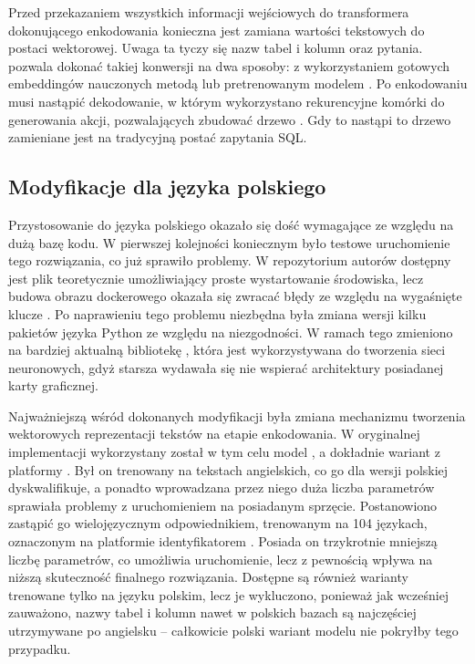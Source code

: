 Przed przekazaniem wszystkich informacji wejściowych do transformera dokonującego enkodowania konieczna jest zamiana wartości tekstowych do postaci wektorowej. Uwaga ta tyczy się nazw tabel i kolumn oraz pytania.  pozwala dokonać takiej konwersji na dwa sposoby: z wykorzystaniem gotowych embeddingów nauczonych metodą  lub pretrenowanym modelem . Po enkodowaniu musi nastąpić dekodowanie, w którym wykorzystano rekurencyjne komórki  do generowania akcji, pozwalających zbudować drzewo . Gdy to nastąpi to drzewo zamieniane jest na tradycyjną postać zapytania SQL.

\subsection{Modyfikacje dla języka polskiego}
Przystosowanie  do języka polskiego okazało się dość wymagające ze względu na dużą bazę kodu. W pierwszej kolejności koniecznym było testowe uruchomienie tego rozwiązania, co już sprawiło problemy. W repozytorium autorów dostępny jest plik  teoretycznie umożliwiający proste wystartowanie środowiska, lecz budowa obrazu dockerowego okazała się zwracać błędy ze względu na wygaśnięte klucze . Po naprawieniu tego problemu niezbędna była zmiana wersji kilku pakietów języka Python ze względu na niezgodności. W ramach tego zmieniono na bardziej aktualną bibliotekę , która jest wykorzystywana do tworzenia sieci neuronowych, gdyż starsza wydawała się nie wspierać architektury posiadanej karty graficznej.

Najważniejszą wśród dokonanych modyfikacji była zmiana mechanizmu tworzenia wektorowych reprezentacji tekstów na etapie enkodowania. W oryginalnej implementacji wykorzystany został w tym celu model , a dokładnie wariant  z platformy . Był on trenowany na tekstach angielskich, co go dla wersji polskiej dyskwalifikuje, a ponadto wprowadzana przez niego duża liczba parametrów sprawiała problemy z uruchomieniem na posiadanym sprzęcie. Postanowiono zastąpić go wielojęzycznym odpowiednikiem, trenowanym na 104 językach, oznaczonym na platformie  identyfikatorem . Posiada on trzykrotnie mniejszą liczbę parametrów, co umożliwia uruchomienie, lecz z pewnością wpływa na niższą skuteczność finalnego rozwiązania. Dostępne są również warianty trenowane tylko na języku polskim, lecz je wykluczono, ponieważ jak wcześniej zauważono, nazwy tabel i kolumn nawet w polskich bazach są najczęściej utrzymywane po angielsku -- całkowicie polski wariant modelu  nie pokryłby tego przypadku. 

